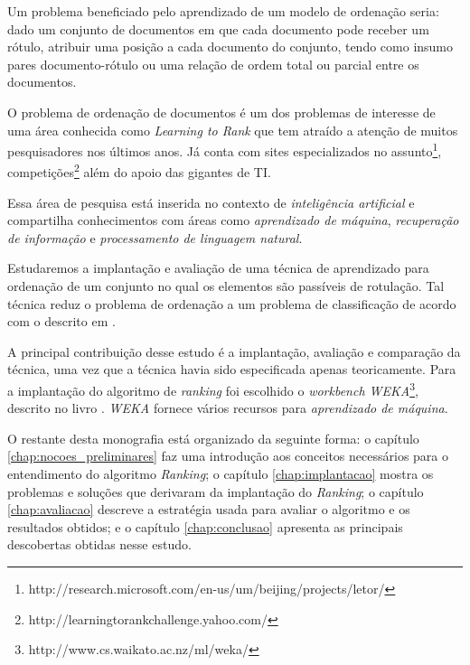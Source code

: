 Um problema beneficiado pelo aprendizado de um modelo de ordenação seria: dado um conjunto de documentos em que cada documento pode receber um rótulo, atribuir uma posição a cada documento do conjunto, tendo como insumo pares documento-rótulo ou uma relação de ordem total ou parcial entre os documentos.

O problema de ordenação de documentos é um dos problemas de interesse de uma área  conhecida como \emph{Learning to Rank} que tem atraído a atenção de muitos pesquisadores nos últimos anos. Já conta com sites especializados no assunto\footnote{http://research.microsoft.com/en-us/um/beijing/projects/letor/}, competições\footnote{http://learningtorankchallenge.yahoo.com/} além do apoio das gigantes de TI.

Essa área de pesquisa está inserida no contexto de \emph{inteligência artificial} e compartilha conhecimentos com áreas como \emph{aprendizado de máquina}, \emph{recuperação de informação} e \emph{processamento de linguagem natural}.

Estudaremos a implantação e avaliação de uma técnica de aprendizado para ordenação de um conjunto no qual os elementos são passíveis de rotulação. Tal técnica reduz o problema de ordenação a um problema de classificação de acordo com o descrito em \cite{langford08}.

A principal contribuição desse estudo é a implantação, avaliação e comparação da técnica, uma vez que a técnica havia sido especificada apenas teoricamente. Para a implantação do algoritmo de \emph{ranking} foi escolhido o  \emph{workbench WEKA}\footnote{http://www.cs.waikato.ac.nz/ml/weka/}, descrito no livro \cite{wekabook}. \emph{WEKA} fornece vários recursos para \emph{aprendizado de máquina}.

O restante desta monografia está organizado da seguinte forma: o capítulo \ref{chap:nocoes_preliminares} faz uma introdução aos conceitos necessários para o entendimento do algoritmo \emph{Ranking}; o capítulo \ref{chap:implantacao} mostra os problemas e soluções que derivaram da implantação do \emph{Ranking}; o capítulo \ref{chap:avaliacao} descreve a estratégia usada para avaliar o algoritmo e os resultados obtidos; e o capítulo \ref{chap:conclusao} apresenta as principais descobertas obtidas nesse estudo.